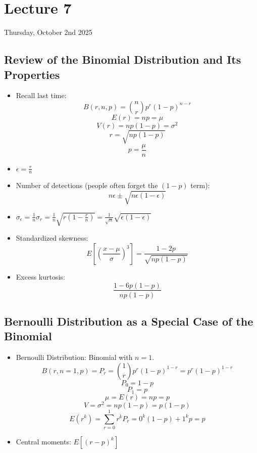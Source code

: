 \section{Lecture 7}

Thursday, October 2nd 2025

\subsection{Review of the Binomial Distribution and Its Properties}

\begin{itemize}
      \item Recall last time:
            \[ B(r, n, p) = \binom{n}{r} p^r (1-p)^{n-r} \]
            \[ E(r) = np = \mu \]
            \[ V(r) = np(1-p) = \sigma^2 \]
            \[ r = \sqrt{np(1-p)} \]
            \[ p = \frac{\mu}{n} \]

      \item $\epsilon = \frac{r}{n}$
      \item Number of detections (people often forget the $(1-p)$ term):
            \[ n \epsilon \pm \sqrt{n \epsilon (1-\epsilon)} \]

      \item $\sigma_{\epsilon} = \frac{1}{n} \sigma_r = \frac{1}{n} \sqrt{r \left(1-\frac{r}{n}\right)} = \frac{1}{\sqrt{n}} \sqrt{\epsilon (1-\epsilon)}$

      \item Standardized skewness:
            \[ E \left[ \left( \frac{x-\mu}{\sigma} \right)^3 \right] = \frac{1-2p}{\sqrt{np(1-p)}} \]

      \item Excess kurtosis:
            \[ \frac{1-6p(1-p)}{np(1-p)} \]
\end{itemize}

\subsection{Bernoulli Distribution as a Special Case of the Binomial}

\begin{itemize}
      \item Bernoulli Distribution: Binomial with $n=1$.
            \[ B(r, n=1, p) = P_r = \binom{1}{r} p^r (1-p)^{1-r} = p^r (1-p)^{1-r} \]
            \[ P_0 = 1 - p \]
            \[ P_1 = p \]
            \[ \mu  = E(r) = np = p \]
            \[ V = \sigma^2 = np(1-p) = p(1-p) \]
            \[ E(r^k) = \sum_{r=0}^{1} r^k P_r = 0^k (1-p) + 1^k p = p \]
      \item Central moments: $E[(r-p)^k]$
\end{itemize}

